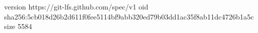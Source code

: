version https://git-lfs.github.com/spec/v1
oid sha256:5cb018d26b2d611f0fee5114bf9abb320ed79b03dd1ac35f8ab11dc4726b1a5c
size 5584
